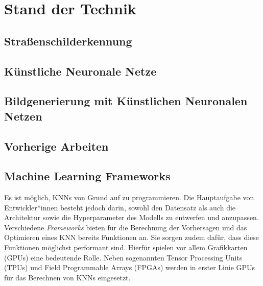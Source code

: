 \chapter{Stand der Technik}
\section{Straßenschilderkennung}


\section{Künstliche Neuronale Netze}


\section{Bildgenerierung mit Künstlichen Neuronalen Netzen}


%

\section{Vorherige Arbeiten}


\section{Machine Learning Frameworks}


Es ist möglich, \acp{KNN} von Grund auf zu programmieren. Die Hauptaufgabe von Entwickler*innen besteht jedoch darin, sowohl den Datensatz als auch die Architektur sowie die Hyperparameter des Modells zu entwerfen und anzupassen. Verschiedene \emph{Frameworks} bieten für die Berechnung der Vorhersagen und das Optimieren eines \ac{KNN} bereits Funktionen an. Sie sorgen zudem dafür, dass diese Funktionen möglichst performant sind. Hierfür spielen vor allem Grafikkarten (\acp{GPU}) eine bedeutende Rolle. Neben sogenannten Tensor Processing Units (TPUs) und Field Programmable Arrays (FPGAs) werden in erster Linie \acp{GPU} für das Berechnen von \acp{KNN} eingesetzt. \cite{frameworks}

